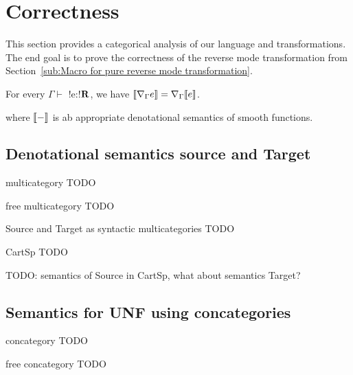 \section{Correctness}
\label{sec:correctness}

This section provides a categorical analysis of our language and transformations.
The end goal is to prove the correctness of the reverse mode transformation from Section~\ref{sub:Macro for pure reverse mode transformation}.

 \begin{theorem}
     For every $\Gamma \vdash$ !e:!$\mathbf{R}$, we have 
     $\llbracket \nabla_\Gamma e\rrbracket= \nabla_\Gamma\llbracket e\rrbracket$.
 \end{theorem}
where $\llbracket -\rrbracket$ is ab appropriate denotational semantics of smooth functions.

\subsection{Denotational semantics source and Target} %
\label{sub:Denotational semantics source and Target}

\begin{definition}{multicategory}
    TODO
\end{definition}

\begin{definition}{free multicategory}
    TODO
\end{definition}

\begin{example}{Source and Target as syntactic multicategories}
    TODO
\end{example}

\begin{definition}{CartSp}
    TODO
\end{definition}

TODO: semantics of Source in CartSp, what about semantics Target?

\subsection{Semantics for UNF using concategories} %
\label{sub:Semantics for UNF using concategories}

\begin{definition}{concategory}
    TODO
\end{definition}

\begin{definition}{free concategory}
    TODO
\end{definition}

